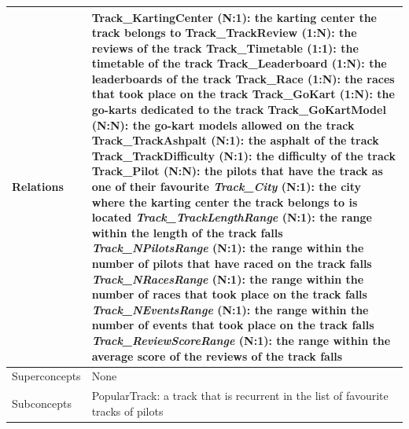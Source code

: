 \documentclass{beamer}
\begin{document}
\begin{frame}
\begin{table}
\tiny
\begin{tabular}{|p{2cm}|p{6cm}|}
\hline
Relations &
Track\_KartingCenter (N:1): the karting center the track belongs to \newline
Track\_TrackReview (1:N): the reviews of the track \newline
Track\_Timetable (1:1): the timetable of the track \newline
Track\_Leaderboard (1:N): the leaderboards of the track \newline
Track\_Race (1:N): the races that took place on the track \newline
Track\_GoKart (1:N): the go-karts dedicated to the track \newline
Track\_GoKartModel (N:N): the go-kart models allowed on the track \newline
Track\_TrackAshpalt (N:1): the asphalt of the track \newline
Track\_TrackDifficulty (N:1): the difficulty of the track \newline
Track\_Pilot (N:N): the pilots that have the track as one of their favourite \newline
\textit{Track\_City} (N:1): the city where the karting center the track belongs to is located \newline
\textit{Track\_TrackLengthRange} (N:1): the range within the length of the track falls \newline
\textit{Track\_NPilotsRange} (N:1): the range within the number of pilots that have raced on the track falls \newline
\textit{Track\_NRacesRange} (N:1): the range within the number of races that took place on the track falls \newline
\textit{Track\_NEventsRange} (N:1): the range within the number of events that took place on the track falls \newline
\textit{Track\_ReviewScoreRange} (N:1): the range within the average score of the reviews of the track falls \\
\hline
Superconcepts & None \\
\hline
Subconcepts & 
PopularTrack: a track that is recurrent in the list of favourite tracks of pilots \\
\hline
\end{tabular}
\end{table}
\end{frame}
\end{document}
